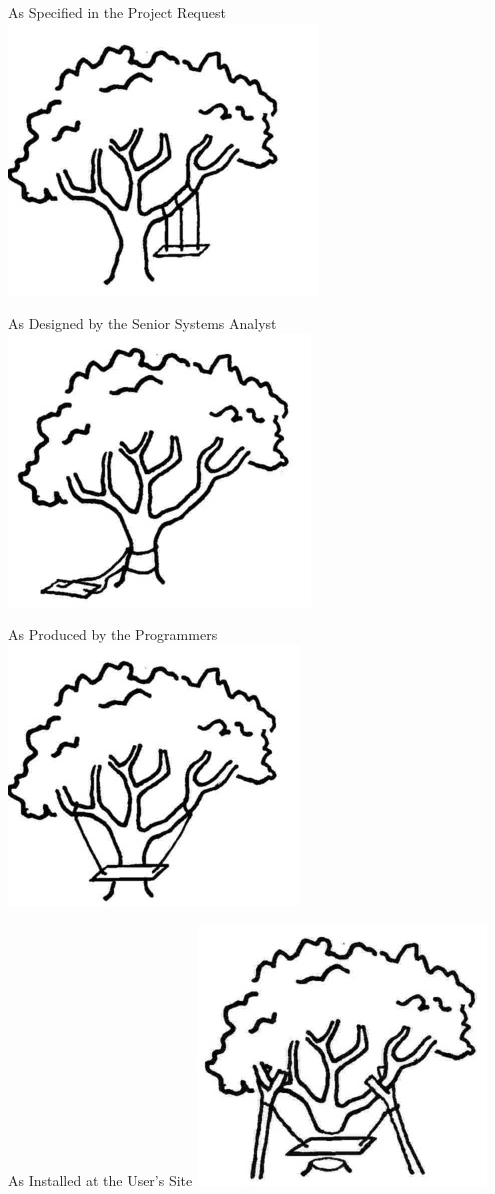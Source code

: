 \documentclass{beamer}
\begin{document}
\begin{frame}[t]{As Specified in the Project Request}
    \centering
    \includegraphics[width=.4\textwidth]{treemana.jpg} 
\end{frame}
\begin{frame}[t]{As Designed by the Senior Systems Analyst}
    \centering
    \includegraphics[width=.4\textwidth]{treeeng.jpg} 
\end{frame}
\begin{frame}[t]{As Produced by the Programmers}
    \centering
    \includegraphics[width=.4\textwidth]{treemanu.jpg} 
\end{frame}
\begin{frame}[t]{As Installed at the User's Site}
    \centering
    \includegraphics[width=.4\textwidth]{treemain.jpg} 
\end{frame}
\end{document}
